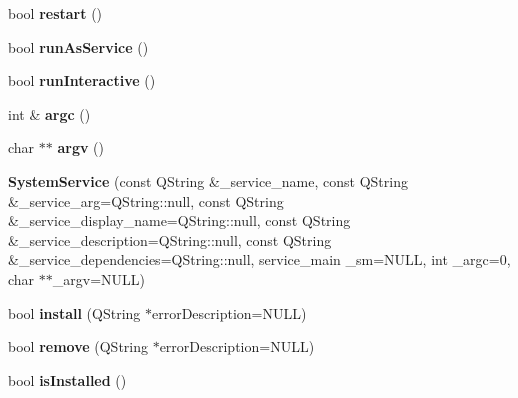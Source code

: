 \begin{DoxyCompactItemize}
\item 
\hypertarget{class_system_service_a5e038df3aa1fb6126c7c7e953ff018e4}{bool {\bfseries restart} ()}\label{class_system_service_a5e038df3aa1fb6126c7c7e953ff018e4}

\item 
\hypertarget{class_system_service_ad2dd4ffca97814be7077922b14ac6737}{bool {\bfseries run\-As\-Service} ()}\label{class_system_service_ad2dd4ffca97814be7077922b14ac6737}

\item 
\hypertarget{class_system_service_aca576c90c82b50eb97106e97b58bb7fa}{bool {\bfseries run\-Interactive} ()}\label{class_system_service_aca576c90c82b50eb97106e97b58bb7fa}

\item 
\hypertarget{class_system_service_a9bd10b10928c484e96f5f06830f4c59a}{int \& {\bfseries argc} ()}\label{class_system_service_a9bd10b10928c484e96f5f06830f4c59a}

\item 
\hypertarget{class_system_service_a0954ce8d857694cc75746232370e74a3}{char $\ast$$\ast$ {\bfseries argv} ()}\label{class_system_service_a0954ce8d857694cc75746232370e74a3}

\item 
\hypertarget{class_system_service_a8e6d9057c5b084217ebe00098d66dd13}{{\bfseries System\-Service} (const Q\-String \&\-\_\-service\-\_\-name, const Q\-String \&\-\_\-service\-\_\-arg=Q\-String\-::null, const Q\-String \&\-\_\-service\-\_\-display\-\_\-name=Q\-String\-::null, const Q\-String \&\-\_\-service\-\_\-description=Q\-String\-::null, const Q\-String \&\-\_\-service\-\_\-dependencies=Q\-String\-::null, service\-\_\-main \-\_\-sm=N\-U\-L\-L, int \-\_\-argc=0, char $\ast$$\ast$\-\_\-argv=N\-U\-L\-L)}\label{class_system_service_a8e6d9057c5b084217ebe00098d66dd13}

\item 
\hypertarget{class_system_service_a7e2d5e306ebe477ae912af62d1d33f64}{bool {\bfseries install} (Q\-String $\ast$error\-Description=N\-U\-L\-L)}\label{class_system_service_a7e2d5e306ebe477ae912af62d1d33f64}

\item 
\hypertarget{class_system_service_a785360539331618e97da26f5bf8e7986}{bool {\bfseries remove} (Q\-String $\ast$error\-Description=N\-U\-L\-L)}\label{class_system_service_a785360539331618e97da26f5bf8e7986}

\item 
\hypertarget{class_system_service_acc5206dcbece30a5274bccda08f61eae}{bool {\bfseries is\-Installed} ()}\label{class_system_service_acc5206dcbece30a5274bccda08f61eae}


\end{DoxyCompactItemize}
